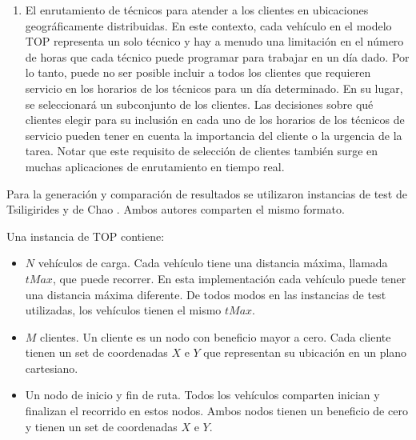 \begin{enumerate}[i]
\item

El enrutamiento de técnicos para atender a los clientes en ubicaciones geográficamente distribuidas. En este contexto, cada vehículo en el modelo TOP representa un solo técnico y hay a menudo una limitación en el número de horas que cada técnico puede programar para trabajar en un día dado. Por lo tanto, puede no ser posible incluir a todos los clientes que requieren servicio en los horarios de los técnicos para un día determinado. En su lugar, se seleccionará un subconjunto de los clientes. Las decisiones sobre qué clientes elegir para su inclusión en cada uno de los horarios de los técnicos de servicio pueden tener en cuenta la importancia del cliente o la urgencia de la tarea. Notar que este requisito de selección de clientes también surge en muchas aplicaciones de enrutamiento en tiempo real.

\end{enumerate}

Para la generación y comparación de resultados se utilizaron instancias de test de Tsiligirides y de Chao \cite{IntancesChaoTsiligirides}. Ambos autores comparten el mismo formato. 

\bigskip

\begin{minipage}{\textwidth}
Una instancia de TOP contiene:

\begin{itemize}
  \item $N$ vehículos de carga. Cada vehículo tiene una distancia máxima, llamada $tMax$, que puede recorrer. En esta implementación cada vehículo puede tener una distancia máxima diferente. De todos modos en las instancias de test utilizadas, los vehículos tienen el mismo $tMax$.
  \item $M$ clientes. Un cliente es un nodo con beneficio mayor a cero. Cada cliente tienen un set de coordenadas $X$ e $Y$ que representan su ubicación en un plano cartesiano.
  \item Un nodo de inicio y fin de ruta. Todos los vehículos comparten inician y finalizan el recorrido en estos nodos. Ambos nodos tienen un beneficio de cero y tienen un set de coordenadas $X$ e $Y$.
\end{itemize}
\end{minipage}

\bigskip

